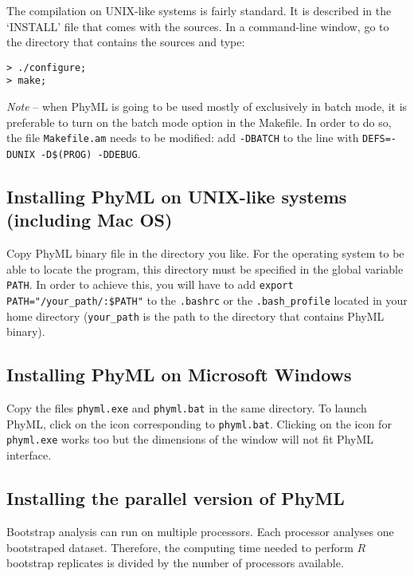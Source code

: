 \documentclass[a4paper,12pt]{article}
\newcommand{\x}[1]{\texttt{#1}}
\begin{document}
The compilation on UNIX-like systems is fairly  standard. It is described in the `INSTALL' file that
comes with the sources. In a command-line window,  go to the directory that contains the sources and
type:

{\setlength{\baselineskip}{0.5\baselineskip}
\begin{verbatim}
> ./configure;
> make;
\end{verbatim}
}

{\em Note} -- when PhyML  is going to be used mostly of exclusively in  batch mode, it is preferable
to turn on the batch mode option in the  Makefile. In order to do so, the file \x{Makefile.am} needs
to be modified: add \x{-DBATCH} to the line with \x{DEFS=-DUNIX -D\$(PROG) -DDEBUG}.



\subsection{Installing PhyML on UNIX-like systems (including Mac OS)}

Copy PhyML binary file in the directory you like.  For the operating system to be able to locate the
program, this directory must be specified in the global variable \x{PATH}. In order to achieve this,
you  will   have  to  add  \x{export   PATH="/your\_path/:\${PATH}"}  to  the   \x{.bashrc}  or  the
\x{.bash\_profile} located in your home directory  (\x{your\_path} is the path to the directory that
contains PhyML binary).


\subsection{Installing PhyML on Microsoft Windows}\label{sec:install_windows}

Copy the files \x{phyml.exe} and \x{phyml.bat} in  the same directory. To launch PhyML, click on the
icon  corresponding to \x{phyml.bat}.   Clicking on  the icon  for \x{phyml.exe}  works too  but the
dimensions of the window will not fit PhyML interface.

\subsection{Installing the parallel version of PhyML}\label{sec:MPI}

Bootstrap analysis can run on multiple  processors. Each processor analyses one bootstraped dataset.
Therefore, the computing time needed to perform $R$ bootstrap replicates is divided by the number of
processors available.
\end{document}
